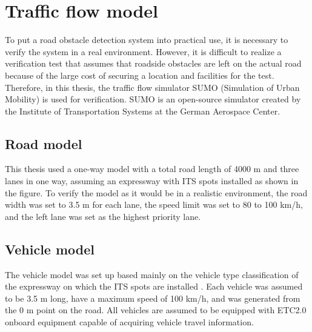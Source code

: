 \documentclass[paper]{ieice}
\begin{document}
\section{Traffic flow model}
\label{sec:traffic_flow_model}
%
To put a road obstacle detection system into practical use, it is necessary to verify the system in a real environment.
%
However, it is difficult to realize a verification test that assumes that roadside obstacles are left on the actual road because of the large cost of securing a location and facilities for the test.
%
Therefore, in this thesis, the traffic flow simulator SUMO (Simulation of Urban Mobility) \cite{sumo} is used for verification.
%
SUMO is an open-source simulator created by the Institute of Transportation Systems at the German Aerospace Center.
%
\subsection{Road model}
\label{sec:road_model}
%
This thesis used a one-way model with a total road length of 4000 m and three lanes in one way, assuming an expressway with ITS spots installed as shown in the figure.
%
To verify the model as it would be in a realistic environment, the road width was set to 3.5 m for each lane, the speed limit was set to 80 to 100 km/h, and the left lane was set as the highest priority lane.
%
\subsection{Vehicle model}
\label{sec:vehicle_model}
%
The vehicle model was set up based mainly on the vehicle type classification of the expressway on which the ITS spots are installed \cite{syasyukubun}.
%
Each vehicle was assumed to be 3.5 m long, have a maximum speed of 100 km/h, and was generated from the 0 m point on the road.
%
All vehicles are assumed to be equipped with ETC2.0 onboard equipment capable of acquiring vehicle travel information.
%


\begin{thebibliography}{99}%
\bibitem{}
\end{thebibliography}

\end{document}
